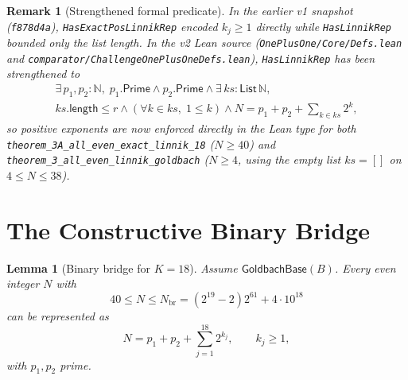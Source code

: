 \documentclass[11pt,a4paper]{article}
\newtheorem{lemma}[theorem]{Lemma}
\newtheorem{remark}[theorem]{Remark}
\newcommand{\GoldbachBase}{\mathsf{GoldbachBase}}
\begin{document}
\begin{remark}[Strengthened formal predicate]\label{rem:predicate}
In the earlier v1 snapshot (\texttt{f878d4a}), \texttt{HasExactPosLinnikRep} encoded $k_j \ge 1$ directly while \texttt{HasLinnikRep} bounded only the list length. In the v2 Lean source (\texttt{OnePlusOne/Core/Defs.lean} and \texttt{comparator/ChallengeOnePlusOneDefs.lean}), \texttt{HasLinnikRep} has been strengthened to
\begin{multline*}
  \exists\, p_1, p_2 : \mathbb{N},\; p_1.\mathsf{Prime} \wedge p_2.\mathsf{Prime} \wedge
  \exists\, ks : \mathsf{List}\,\mathbb{N},\\
  ks.\mathsf{length} \le r \wedge (\forall k \in ks,\; 1 \le k) \wedge N = p_1 + p_2 + \sum_{k \in ks} 2^k,
\end{multline*}
so positive exponents are now enforced directly in the Lean type for both \texttt{theorem\_3A\_all\_even\_exact\_linnik\_18} ($N \ge 40$) and \texttt{theorem\_3\_all\_even\_linnik\_goldbach} ($N \ge 4$, using the empty list $ks = []$ on $4 \le N \le 38$).
\end{remark}

\section{The Constructive Binary Bridge}

\begin{lemma}[Binary bridge for $K = 18$]\label{lem:bridge}
Assume $\GoldbachBase(B)$. Every even integer $N$ with
\[
  40 \le N \le N_{\mathrm{br}} = (2^{19} - 2)2^{61} + 4\cdot 10^{18}
\]
can be represented as
\[
  N = p_1 + p_2 + \sum_{j=1}^{18} 2^{k_j}, \qquad k_j \ge 1,
\]
with $p_1, p_2$ prime.
\end{lemma}
\end{document}
